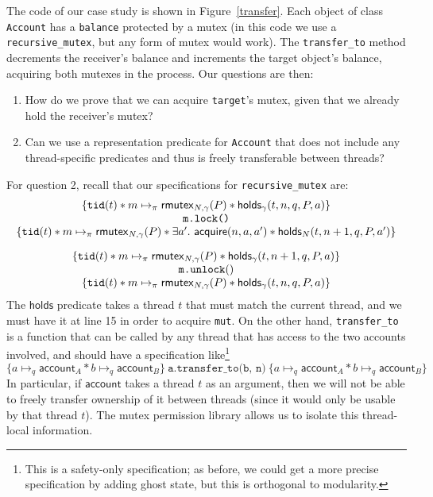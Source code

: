 \documentclass[acmsmall,screen,review,anonymous]{acmart}
\begin{document}
The code of our case study is shown in Figure~\ref{transfer}. Each object of class \lstinline{Account} has a \lstinline{balance} protected by a mutex (in this code we use a \lstinline{recursive_mutex}, but any form of mutex would work). %
The \lstinline{transfer_to} method decrements the receiver's %
balance and increments the target object's balance, acquiring both mutexes in the process. Our questions are then:
\begin{enumerate}
\item How do we prove that we can acquire \lstinline{target}'s mutex, given that we already hold the receiver's mutex?
\item Can we use a representation predicate for \lstinline{Account} that does not include any thread-specific predicates and thus is freely transferable between threads?
\end{enumerate}

For question 2, recall that our specifications for \lstinline{recursive_mutex} are:
\[\begin{array}{c}
\{\currentthread{t} \ast m \mapsto_\pi \rmutex{N, \gamma}{P}\ast\acquirable{\gamma}{t}{n}{q}{P}{a}\}\\ {\texttt{m.lock()}} \\ \{\currentthread{t} \ast m \mapsto_\pi \rmutex{N, \gamma}{P}\ast \exists a'.\ \mathsf{acquire}(n, a, a') \ast \acquirable{N}{t}{n+1}{q}{P}{a'}\}  \vspace{1em}\\
    \{\currentthread{t} \ast m \mapsto_\pi \rmutex{N, \gamma}{P}\ast\acquirable{\gamma}{t}{n+1}{q}{P}{a}\}\\ {\texttt{m.unlock}()}\\
    \{\currentthread{t} \ast m \mapsto_\pi \rmutex{N, \gamma}{P}\ast\acquirable{\gamma}{t}{n}{q}{P}{a}\}
\end{array}\]
The $\mathsf{holds}$ predicate takes a thread $t$ that must match the current thread, and we must have it at line 15 %
in order to acquire \lstinline{mut}. On the other hand, \lstinline{transfer_to} is a function that can be called by any thread that has access to the two accounts involved, and should have a specification like\footnote{This is a safety-only specification; as before, we could get a more precise specification by adding ghost state, but this is orthogonal to modularity.}
\[ \{ a \mapsto_q \mathsf{account}_A \ast b \mapsto_q \mathsf{account}_B \}\ \texttt{a.transfer\_to(b, n)}\ \{ a \mapsto_q \mathsf{account}_A \ast b \mapsto_q \mathsf{account}_B \}\]
In particular, if $\mathsf{account}$ takes a thread $t$ as an argument, then we will not be able to freely transfer ownership of it between threads (since it would only be usable by that thread $t$). The mutex permission library allows us to isolate this thread-local information. 
\end{document}
